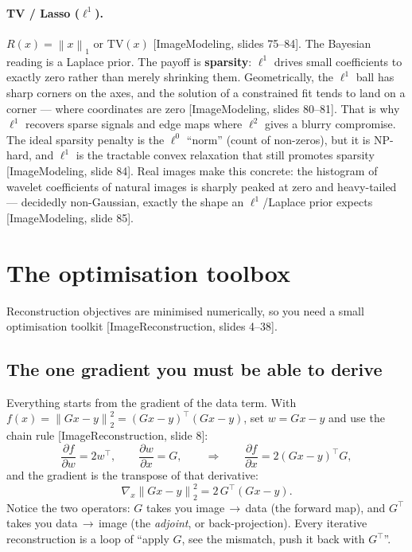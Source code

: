 \documentclass[11pt]{article}
\newcommand{\norm}[1]{\left\lVert #1 \right\rVert}
\newcommand{\deck}[1]{\textsf{\small[#1]}}
\begin{document}
\paragraph{TV / Lasso ($\ell^1$).} $R(x)=\norm{x}_1$ or $\mathrm{TV}(x)$
\deck{ImageModeling, slides 75--84}. The Bayesian reading is a Laplace prior.
The payoff is \textbf{sparsity}: $\ell^1$ drives small coefficients to exactly
zero rather than merely shrinking them. Geometrically, the $\ell^1$ ball has
sharp corners on the axes, and the solution of a constrained fit tends to land
on a corner --- where coordinates are zero \deck{ImageModeling, slides 80--81}.
That is why $\ell^1$ recovers sparse signals and edge maps where $\ell^2$ gives
a blurry compromise. The ideal sparsity penalty is the $\ell^0$ ``norm'' (count
of non-zeros), but it is NP-hard, and $\ell^1$ is the tractable convex
relaxation that still promotes sparsity \deck{ImageModeling, slide 84}. Real
images make this concrete: the histogram of wavelet coefficients of natural
images is sharply peaked at zero and heavy-tailed --- decidedly non-Gaussian,
exactly the shape an $\ell^1$/Laplace prior expects \deck{ImageModeling,
slide 85}.

\section{The optimisation toolbox}

Reconstruction objectives are minimised numerically, so you need a small
optimisation toolkit \deck{ImageReconstruction, slides 4--38}.

\subsection{The one gradient you must be able to derive}

Everything starts from the gradient of the data term. With $f(x)=\norm{Gx-y}_2^2
= (Gx-y)^{\!\top}(Gx-y)$, set $w=Gx-y$ and use the chain rule
\deck{ImageReconstruction, slide 8}:
\[
\frac{\partial f}{\partial w} = 2w^{\!\top},
\qquad
\frac{\partial w}{\partial x} = G,
\qquad\Rightarrow\qquad
\frac{\partial f}{\partial x} = 2(Gx-y)^{\!\top}G,
\]
and the gradient is the transpose of that derivative:
\[
\boxed{\;\nabla_x \norm{Gx-y}_2^2 = 2\,G^{\!\top}(Gx-y).\;}
\]
Notice the two operators: $G$ takes you image$\,\to\,$data (the forward map),
and $G^{\!\top}$ takes you data$\,\to\,$image (the \emph{adjoint}, or
back-projection). Every iterative reconstruction is a loop of ``apply $G$, see
the mismatch, push it back with $G^{\!\top}$''.
\end{document}
